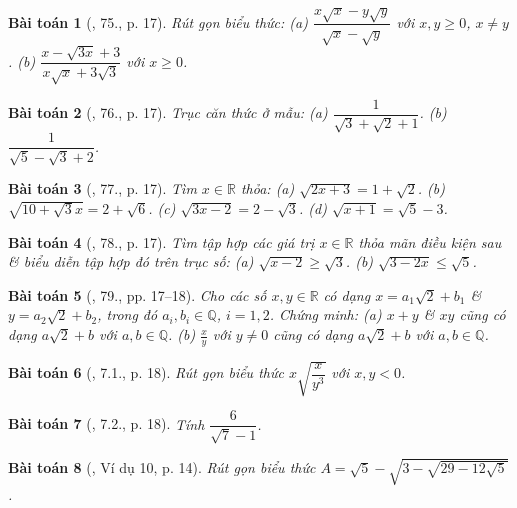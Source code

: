 \documentclass{article}
\newtheorem{baitoan}{Bài toán}
\begin{document}
\begin{baitoan}[\cite{SBT_Toan_9_tap_1}, 75., p. 17]
	Rút gọn biểu thức: (a) $\dfrac{x\sqrt{x} - y\sqrt{y}}{\sqrt{x} - \sqrt{y}}$ với $x,y\ge0$, $x\ne y$. (b) $\dfrac{x - \sqrt{3x} + 3}{x\sqrt{x} + 3\sqrt{3}}$ với $x\ge0$.
\end{baitoan}

\begin{baitoan}[\cite{SBT_Toan_9_tap_1}, 76., p. 17]
	Trục căn thức ở mẫu: (a) $\dfrac{1}{\sqrt{3} + \sqrt{2} + 1}$. (b) $\dfrac{1}{\sqrt{5} - \sqrt{3} + 2}$.
\end{baitoan}

\begin{baitoan}[\cite{SBT_Toan_9_tap_1}, 77., p. 17]
	Tìm $x\in\mathbb{R}$ thỏa: (a) $\sqrt{2x + 3} = 1 + \sqrt{2}$. (b) $\sqrt{10 + \sqrt{3}x} = 2 + \sqrt{6}$. (c) $\sqrt{3x - 2} = 2 - \sqrt{3}$. (d) $\sqrt{x + 1} = \sqrt{5} - 3$.
\end{baitoan}

\begin{baitoan}[\cite{SBT_Toan_9_tap_1}, 78., p. 17]
	Tìm tập hợp các giá trị $x\in\mathbb{R}$ thỏa mãn điều kiện sau \& biểu diễn tập hợp đó trên trục số: (a) $\sqrt{x - 2}\ge\sqrt{3}$. (b) $\sqrt{3 - 2x}\le\sqrt{5}$.
\end{baitoan}

\begin{baitoan}[\cite{SBT_Toan_9_tap_1}, 79., pp. 17--18]
	Cho các số $x,y\in\mathbb{R}$ có dạng $x = a_1\sqrt{2} + b_1$ \& $y = a_2\sqrt{2} + b_2$, trong đó $a_i,b_i\in\mathbb{Q}$, $i = 1,2$. Chứng minh: (a) $x + y$ \& $xy$ cũng có dạng $a\sqrt{2} + b$ với $a,b\in\mathbb{Q}$. (b) $\frac{x}{y}$ với $y\ne0$ cũng có dạng $a\sqrt{2} + b$ với $a,b\in\mathbb{Q}$.
\end{baitoan}

\begin{baitoan}[\cite{SBT_Toan_9_tap_1}, 7.1., p. 18]
	Rút gọn biểu thức $x\sqrt{\dfrac{x}{y^3}}$ với $x,y < 0$.
\end{baitoan}

\begin{baitoan}[\cite{SBT_Toan_9_tap_1}, 7.2., p. 18]
	Tính $\dfrac{6}{\sqrt{7} - 1}$.
\end{baitoan}

\begin{baitoan}[\cite{Binh_Toan_9_tap_1}, Ví dụ 10, p. 14]
	Rút gọn biểu thức $A = \sqrt{5} - \sqrt{3 - \sqrt{29 - 12\sqrt{5}}}$.
\end{baitoan}
\end{document}

